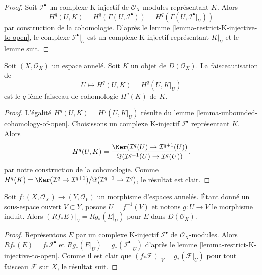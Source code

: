 \begin{proof}

Soit $\mathcal{I}^\bullet$ un complexe K-injectif de $\mathcal{O}_X$-modules représentant $K$. Alors
$$
H^q(U, K) = H^q(\Gamma(U, \mathcal{I}^\bullet)) =
H^q(\Gamma(U, \mathcal{I}^\bullet|_U))
$$
par construction de la cohomologie. D'après le lemme \ref{lemma-restrict-K-injective-to-open},
le complexe $\mathcal{I}^\bullet|_U$ est un complexe K-injectif représentant $K|_U$ et le lemme suit.

\end{proof}

\begin{lemma}

\label{lemma-sheafification-cohomology}
Soit $(X, \mathcal{O}_X)$ un espace annelé. Soit $K$ un objet de $D(\mathcal{O}_X)$. La faisceautisation de $$
U \mapsto H^q(U, K) = H^q(U, K|_U)
$$ est le $q$-ième faisceau de cohomologie $H^q(K)$ de $K$.
\end{lemma}

\begin{proof}

L'égalité $H^q(U, K) = H^q(U, K|_U)$ résulte du lemme \ref{lemma-unbounded-cohomology-of-open}. Choisissons un complexe K-injectif $\mathcal{I}^\bullet$ représentant $K$. Alors
$$
H^q(U, K) =
\frac{\Ker(\mathcal{I}^q(U) \to \mathcal{I}^{q + 1}(U))}
{\Im(\mathcal{I}^{q - 1}(U) \to \mathcal{I}^q(U))}.
$$
par notre construction de la cohomologie. Comme
$H^q(K) = \Ker(\mathcal{I}^q \to \mathcal{I}^{q + 1})/
\Im(\mathcal{I}^{q - 1} \to \mathcal{I}^q)$, le résultat est clair.

\end{proof}

\begin{lemma}

\label{lemma-restrict-direct-image-open}
Soit $f : (X, \mathcal{O}_X) \to (Y, \mathcal{O}_Y)$ un morphisme d'espaces annelés. Étant donné un sous-espace ouvert $V \subset Y$, posons $U = f^{-1}(V)$ et notons $g : U \to V$ le morphisme induit. Alors $(Rf_*E)|_V = Rg_*(E|_U)$ pour $E$ dans $D(\mathcal{O}_X)$.
\end{lemma}

\begin{proof}
Représentons $E$ par un complexe K-injectif $\mathcal{I}^\bullet$ de $\mathcal{O}_X$-modules. Alors $Rf_*(E) = f_*\mathcal{I}^\bullet$ et $Rg_*(E|_U) = g_*(\mathcal{I}^\bullet|_U)$ d'après le lemme \ref{lemma-restrict-K-injective-to-open}. Comme il est clair que $(f_*\mathcal{F})|_V = g_*(\mathcal{F}|_U)$ pour tout faisceau $\mathcal{F}$ sur $X$, le résultat suit.
\end{proof}

